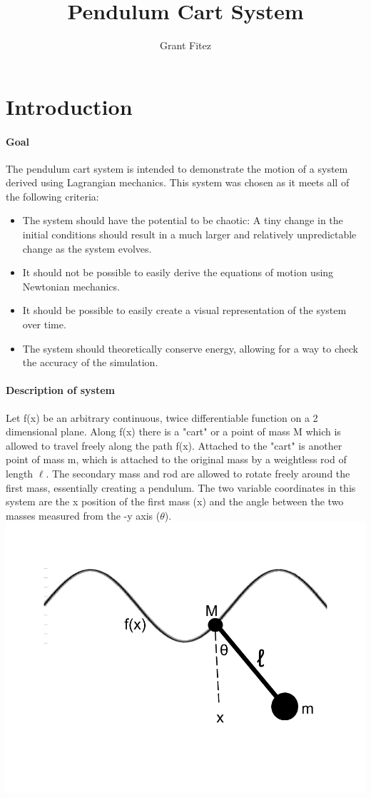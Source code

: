 \documentclass{article}
\begin{document}
\title{Pendulum Cart System}
\author{Grant Fitez}
\maketitle
\section{Introduction}
\paragraph{Goal} The pendulum cart system is intended to demonstrate the motion of a system derived using Lagrangian mechanics. This system was chosen as it meets all of the following criteria:
\begin{itemize}
	\item The system should have the potential to be chaotic: A tiny change in the initial conditions should result in a much larger and relatively unpredictable change as the system evolves.
	\item It should not be possible to easily derive the equations of motion using Newtonian mechanics.
	\item  It should be possible to easily create a visual representation of the system over time.
	\item The system should theoretically conserve energy, allowing for a way to check the accuracy of the simulation. 
\end{itemize}
\paragraph{Description of system} Let f(x) be an arbitrary continuous, twice differentiable function on a 2 dimensional plane. Along f(x) there is a "cart" or a point of mass M which is allowed to travel freely along the path f(x). Attached to the "cart" is another point of mass m, which is attached to the original mass by a weightless rod of length $\ell$. The secondary mass and rod are allowed to rotate freely around the first mass, essentially creating a pendulum. The two variable coordinates in this system are the x position of the first mass (x) and the angle between the two masses measured from the -y axis ($\theta$).
\includegraphics[width=\textwidth,height=\textheight,keepaspectratio]{Pendulum_Cart.png}
\end{document}
